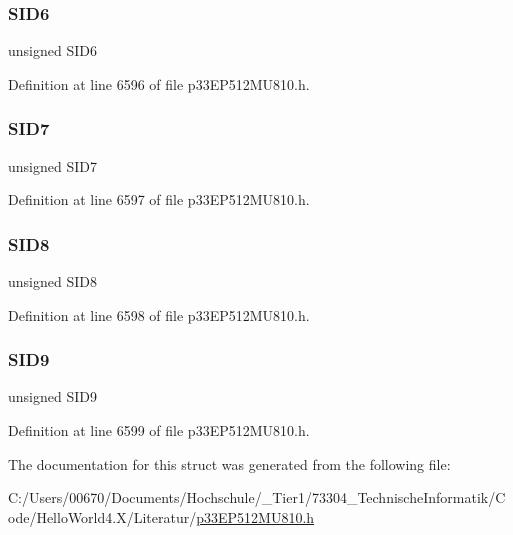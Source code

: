 \subsubsection{\texorpdfstring{S\+I\+D6}{SID6}}
{\footnotesize\ttfamily unsigned S\+I\+D6}



Definition at line 6596 of file p33\+E\+P512\+M\+U810.\+h.

\mbox{\label{structtag_c2_r_x_f7_s_i_d_b_i_t_s_a34097fb76decd431701fa2d86a22328e}} 
\subsubsection{\texorpdfstring{S\+I\+D7}{SID7}}
{\footnotesize\ttfamily unsigned S\+I\+D7}



Definition at line 6597 of file p33\+E\+P512\+M\+U810.\+h.

\mbox{\label{structtag_c2_r_x_f7_s_i_d_b_i_t_s_afe74894633244fdb0b0c01b4e8c522e7}} 
\subsubsection{\texorpdfstring{S\+I\+D8}{SID8}}
{\footnotesize\ttfamily unsigned S\+I\+D8}



Definition at line 6598 of file p33\+E\+P512\+M\+U810.\+h.

\mbox{\label{structtag_c2_r_x_f7_s_i_d_b_i_t_s_a33587704948067005c2a6a3ccc503c99}} 
\subsubsection{\texorpdfstring{S\+I\+D9}{SID9}}
{\footnotesize\ttfamily unsigned S\+I\+D9}



Definition at line 6599 of file p33\+E\+P512\+M\+U810.\+h.



The documentation for this struct was generated from the following file\+:\begin{DoxyCompactItemize}
\item 
C\+:/\+Users/00670/\+Documents/\+Hochschule/\+\_\+\+Tier1/73304\+\_\+\+Technische\+Informatik/\+Code/\+Hello\+World4.\+X/\+Literatur/\hyperlink{p33_e_p512_m_u810_8h}{p33\+E\+P512\+M\+U810.\+h}\end{DoxyCompactItemize}
